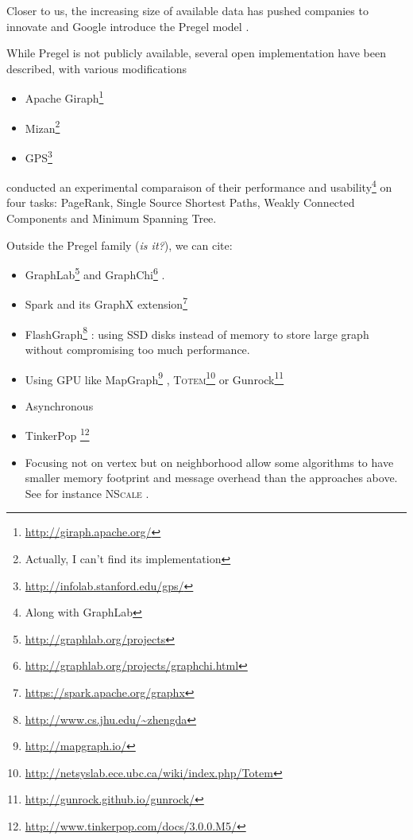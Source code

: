 Closer to us, the increasing size of available data has pushed companies to
innovate and Google introduce the Pregel model \autocite{Pregel10}.

While Pregel is not publicly available, several open implementation have been
described, with various modifications

\begin{itemize}
	\item Apache
		Giraph\footnote{\href{http://giraph.apache.org/}{http://giraph.apache.org/}}
	\item Mizan\footnote{Actually, I can't find its implementation} \autocite{Khayyat2013}
	\item
		GPS\footnote{\href{http://infolab.stanford.edu/gps/}{http://infolab.stanford.edu/gps/}}
		\autocite{Salihoglu2013}
\end{itemize}

\Textcite{Han2014} conducted an experimental comparaison of their performance and
usability\footnote{Along with GraphLab} on four tasks: PageRank, Single Source
Shortest Paths, Weakly Connected Components and Minimum Spanning Tree.

Outside the Pregel family (\emph{is it?}), we can cite:

\begin{itemize}
	\item
		GraphLab\footnote{\href{http://graphlab.org/projects/source.html}{http://graphlab.org/projects}}%
		\autocites{Low2010}{Gonzalez2012}{Low2012}{GraphLab13Low} and
		GraphChi\footnote{\href{http://graphlab.org/projects/graphchi.html}{http://graphlab.org/projects/graphchi.html}}
		\autocite{Kyrola2012}.
	\item
		Spark \autocite{Zaharia2010} and its GraphX
		extension\footnote{\href{https://spark.apache.org/graphx}{https://spark.apache.org/graphx}}
	\item FlashGraph\footnote{\href{http://www.cs.jhu.edu/~zhengda/\#FlashGraph}%
			{\url{http://www.cs.jhu.edu/~zhengda}}} \autocite{FlashGraph14}:
		using SSD disks instead of memory to store large graph without
		compromising too much performance.
	\item Using GPU like MapGraph\footnote{\href{http://mapgraph.io/}{http://mapgraph.io/}}
		\autocite{Fu2014},
		\textsc{Totem}\footnote{\href{http://netsyslab.ece.ubc.ca/wiki/index.php/Totem}%
			{http://netsyslab.ece.ubc.ca/wiki/index.php/Totem}}
		\autocite{Gharaibeh2013} or
		Gunrock\footnote{\href{http://gunrock.github.io/gunrock/}%
			{http://gunrock.github.io/gunrock/}} \autocite{Gunrock15}
	\item Asynchronous \autocite{Wang2013}
	\item TinkerPop \footnote{\href{http://www.tinkerpop.com/docs/3.0.0.M5/}%
			{http://www.tinkerpop.com/docs/3.0.0.M5/}}
	\item Focusing not on vertex but on neighborhood allow some algorithms to
		have smaller memory footprint and message overhead than the approaches
		above. See for instance \textsc{NScale} \autocite{Quamar2014}.
\end{itemize}

